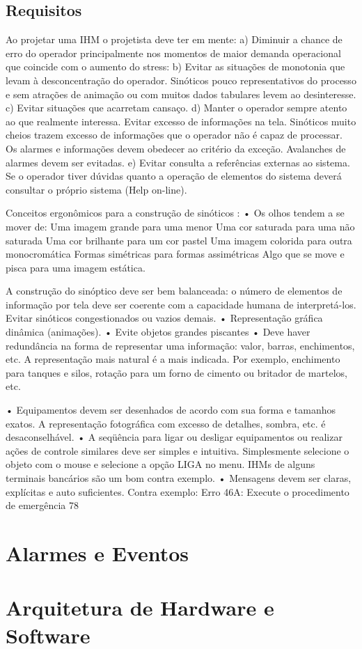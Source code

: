 \subsection{Requisitos}
\label{sub:Requisitos}
Ao projetar uma IHM o projetista deve ter em mente:
a) Diminuir a chance de erro do operador principalmente nos
momentos de maior demanda operacional que coincide com o aumento
do stress:
b) Evitar as situações de monotonia que levam à desconcentração do
operador. Sinóticos pouco representativos do processo e sem atrações
de animação ou com muitos dados tabulares levem ao desinteresse.
c) Evitar situações que acarretam cansaço.
d) Manter o operador sempre atento ao que realmente interessa.
Evitar excesso de informações na tela. Sinóticos muito cheios trazem
excesso de informações que o operador não é capaz de processar. Os
alarmes e informações devem obedecer ao critério da exceção.
Avalanches de alarmes devem ser evitadas.
e) Evitar consulta a referências externas ao sistema. Se o operador
tiver dúvidas quanto a operação de elementos do sistema deverá
consultar o próprio sistema (Help on-line).

Conceitos ergonômicos para a construção de sinóticos :
• Os olhos tendem a se mover de:
Uma imagem grande para uma menor
Uma cor saturada para uma não saturada
Uma cor brilhante para um cor pastel
Uma imagem colorida para outra monocromática
Formas simétricas para formas assimétricas
Algo que se move e pisca para uma imagem estática.

A construção do sinóptico deve ser bem balanceada: o número de
elementos de informação por tela deve ser coerente com a capacidade
humana de interpretá-los. Evitar sinóticos congestionados ou vazios
demais.
• Representação gráfica dinâmica (animações).
• Evite objetos grandes piscantes
• Deve haver redundância na forma de representar uma informação:
valor, barras, enchimentos, etc. A representação mais natural é a mais
indicada. Por exemplo, enchimento para tanques e silos, rotação para um
forno de cimento ou britador de martelos, etc.

• Equipamentos devem ser desenhados de acordo com sua forma e
tamanhos exatos. A representação fotográfica com excesso de
detalhes, sombra, etc. é desaconselhável.
• A seqüência para ligar ou desligar equipamentos ou realizar ações
de controle similares deve ser simples e intuitiva. Simplesmente
selecione o objeto com o mouse e selecione a opção LIGA no menu.
IHMs de alguns terminais bancários são um bom contra exemplo.
• Mensagens devem ser claras, explícitas e auto suficientes. Contra
exemplo: Erro 46A: Execute o procedimento de emergência 78

\section{Alarmes e Eventos}
\label{sec:Alarmes e Eventos}


\section{Arquitetura de Hardware e Software}
\label{sec:Arquitetura de Hardware e Software}

